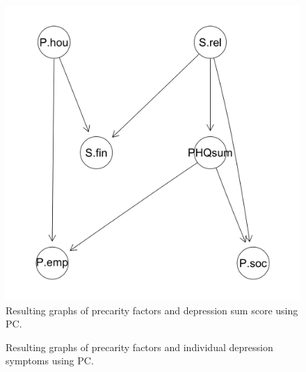 \documentclass[
]{article}
\begin{document}
\begin{figure}
\begin{minipage}{0.50\linewidth}
{\includegraphics[width=1\textwidth,height=\textheight]{img/sum_PC_RCoTonly.png}

}


\end{minipage}%

\caption{\label{fig-pc_sum}Resulting graphs of precarity factors and
depression sum score using PC.}

\end{figure}%

\begin{figure}


\caption{\label{fig-pc_sym}Resulting graphs of precarity factors and
individual depression symptoms using PC.}

\end{figure}%
\end{document}
